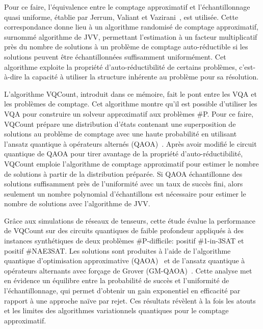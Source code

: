 Pour ce faire, l'équivalence entre le comptage approximatif et l'échantillonnage quasi uniforme, établie par Jerrum, Valiant et Vazirani~\cite{jerrumRandomGenerationCombinatorial1986}, est utilisée. Cette correspondance donne lieu à un algorithme randomisé de comptage approximatif, surnommé algorithme de JVV, permettant l'estimation à un facteur multiplicatif près du nombre de solutions à un problème de comptage auto-réductible si les solutions peuvent être échantillonnées suffisamment uniformément. Cet algorithme exploite la propriété d'auto-réductibilité de certains problèmes, c'est-à-dire la capacité à utiliser la structure inhérente au problème pour sa résolution.

L'algorithme VQCount, introduit dans ce mémoire, fait le pont entre les VQA et les problèmes de comptage. Cet algorithme montre qu'il est possible d'utiliser les VQA pour construire un solveur approximatif aux problèmes \textsf{\#P}. Pour ce faire, VQCount prépare une distribution d'états contenant une superposition de solutions au problème de comptage avec une haute probabilité en utilisant l'ansatz quantique à opérateurs alternés (QAOA)~\cite{hadfieldQuantumApproximateOptimization2019}. Après avoir modifié le circuit quantique de QAOA pour tirer avantage de la propriété d'auto-réductibilité, VQCount emploie l'algorithme de comptage approximatif pour estimer le nombre de solutions à partir de la distribution préparée. Si QAOA échantillonne des solutions suffisamment près de l'uniformité avec un taux de succès fini, alors seulement un nombre polynomial d'échantillons est nécessaire pour estimer le nombre de solutions avec l'algorithme de JVV. 

Grâce aux simulations de réseaux de tenseurs, cette étude évalue la performance de VQCount sur des circuits quantiques de faible profondeur appliqués à des instances synthétiques de deux problèmes \textsf{\#P}-difficile: positif \#1-in-3SAT et positif \#NAE3SAT. Les solutions sont produites à l'aide de l'algorithme quantique d'optimisation approximative (QAOA)~\cite{farhiQuantumApproximateOptimization2014} et de l'ansatz quantique à opérateurs alternants avec forçage de Grover (GM-QAOA)~\cite{bartschiGroverMixersQAOA2020}. Cette analyse met en évidence un équilibre entre la probabilité de succès et l'uniformité de l'échantillonnage, qui permet d'obtenir un gain exponentiel en efficacité par rapport à une approche naïve par rejet. Ces résultats révèlent à la fois les atouts et les limites des algorithmes variationnels quantiques pour le comptage approximatif.

